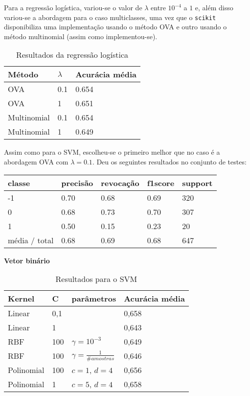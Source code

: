 Para a regressão logística, variou-se o valor de $\lambda$ entre $10^{-4}$ a $1$ e, além disso
variou-se a abordagem para o caso multiclasses, uma vez que o \texttt{scikit} disponibiliza
uma implementação usando o método OVA e outro usando o método multinomial (assim como implementou-se).

\begin{table}[H]
	\centering
	\caption{Resultados da regressão logística}
	\begin{tabular}{l l l}
		\hline
		Método & $\lambda$ & Acurácia média \\
		\hline
		OVA & 0.1 & 0.654 \\
		\hline
		OVA & 1 & 0.651 \\
		\hline
		Multinomial & 0.1 & 0.654 \\
		\hline
		Multinomial & 1 & 0.649 \\
		\hline
	\end{tabular}
\end{table}

Assim como para o SVM, escolheu-se o primeiro melhor que no caso é a abordagem OVA com $\lambda = 0.1$.
Deu os seguintes resultados no conjunto de testes:

\begin{table}[H]
	\centering
		\begin{tabular}{l | l | l | l | l}
		\hline
		classe  	&	precisão  &  revocação &  f1\-score &  support \\
		\hline
         -1   &    0.70  &    0.68   &   0.69   &    320 \\
         \hline
          0    &   0.68   &   0.73   &   0.70   &    307 \\
          \hline
          1    &   0.50   &   0.15   &   0.23   &     20 \\
		\hline
		média / total  &     0.68  &    0.69    &  0.68   &    647 \\
		\hline
	\end{tabular}
\end{table}

\textbf{Vetor binário}

\begin{table}[H]
	\centering
	\caption{Resultados para o SVM}
	\begin{tabular}{l l l l}
		\hline
		Kernel & C & parâmetros & Acurácia média \\
		\hline
		Linear & 0,1 & & 0,658 \\
		\hline
		Linear & 1 & & 0,643 \\
		\hline
		RBF & 100 & $\gamma = 10^{-3}$ & 0,649 \\
		\hline
		RBF & 100 & $\gamma = \frac{1}{\# amostras}$ & 0,646 \\
		\hline
		Polinomial & 100 & $c = 1$, $d = 4$ & 0,656 \\
		\hline
		Polinomial & 1 & $c = 5$, $d = 4$ & 0,658 \\
		\hline
	\end{tabular}
\end{table}

